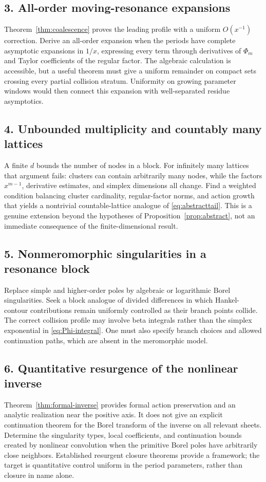\documentclass[11pt,a4paper]{article}
\numberwithin{equation}{section}
\theoremstyle{definition}
\theoremstyle{remark}
\begin{document}
\subsection*{3. All-order moving-resonance expansions}
Theorem~\ref{thm:coalescence} proves the leading profile with a uniform
$O(x^{-1})$ correction. Derive an all-order expansion when the periods
have complete asymptotic expansions in $1/x$, expressing every term
through derivatives of $\Phi_m$ and Taylor coefficients of the regular
factor. The algebraic calculation is accessible, but a useful theorem
must give a uniform remainder on compact sets crossing every partial
collision stratum. Uniformity on growing parameter windows would then
connect this expansion with well-separated residue asymptotics.

\subsection*{4. Unbounded multiplicity and countably many lattices}
A finite $d$ bounds the number of nodes in a block. For infinitely many
lattices that argument fails: clusters can contain arbitrarily many nodes,
while the factors $x^{m-1}$, derivative estimates, and simplex dimensions
all change. Find a weighted condition balancing cluster cardinality,
regular-factor norms, and action growth that yields a nontrivial
countable-lattice analogue of \eqref{eq:abstracttail}. This is a genuine
extension beyond the hypotheses of Proposition~\ref{prop:abstract}, not
an immediate consequence of the finite-dimensional result.

\subsection*{5. Nonmeromorphic singularities in a resonance block}
Replace simple and higher-order poles by algebraic or logarithmic Borel
singularities. Seek a block analogue of divided differences in which
Hankel-contour contributions remain uniformly controlled as their branch
points collide. The correct collision profile may involve beta integrals
rather than the simplex exponential in \eqref{eq:Phi-integral}. One must
also specify branch choices and allowed continuation paths, which are
absent in the meromorphic model.

\subsection*{6. Quantitative resurgence of the nonlinear inverse}
Theorem~\ref{thm:formal-inverse} provides formal action preservation and an
analytic realization near the positive axis. It does not give an explicit
continuation theorem for the Borel transform of the inverse on all relevant
sheets. Determine the singularity types, local coefficients, and
continuation bounds created by nonlinear convolution when the primitive
Borel poles have arbitrarily close neighbors. Established resurgent
closure theorems provide a framework; the target is quantitative control
uniform in the period parameters, rather than closure in name alone.
\end{document}
